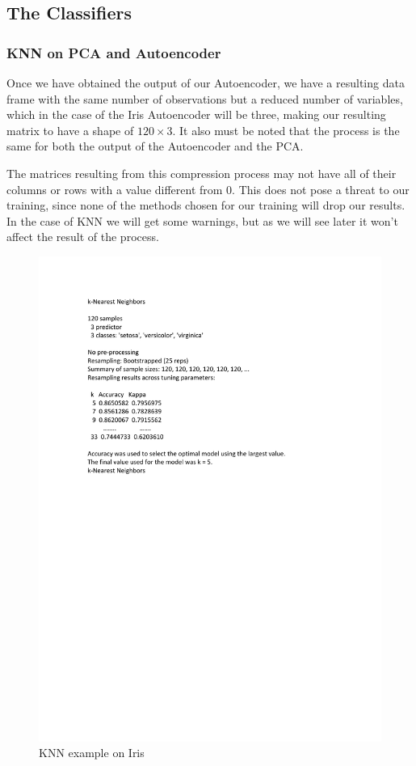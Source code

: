 \subsection{The Classifiers}

\subsubsection{KNN on PCA and Autoencoder}
Once we have obtained the output of our Autoencoder, we have a resulting data frame with the same number of observations but a reduced number of variables, which in the case of the Iris Autoencoder will be three, making our resulting matrix to have a shape of $120\times3$. It also must be noted that the process is the same for both the output of the Autoencoder and the PCA.\par

The matrices resulting from this compression process may not have all of their columns or rows with a value different from 0. This does not pose a threat to our training, since none of the methods chosen for our training will drop our results. In the case of KNN  we will get some warnings, but as we will see later it won't affect the result of the process. 
%
\begin{figure}[H]
	\centering
	\includegraphics[width=15cm]{Figuras_tfg/Knn_example}
	\caption{KNN example on Iris}
	\label{fig:figure_Knn_Iris}
\end{figure}

